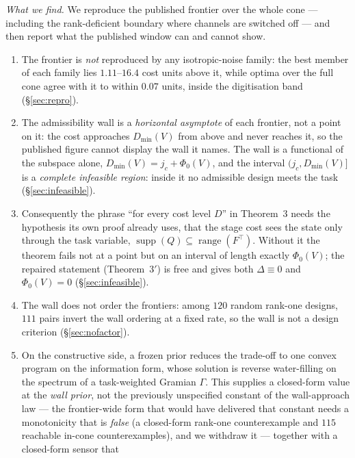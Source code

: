 \emph{What we find.} We reproduce the published frontier over the whole cone ---
including the rank-deficient boundary where channels are switched off --- and
then report what the published window can and cannot show.
\begin{enumerate}\itemsep2pt
\item The frontier is \emph{not} reproduced by any isotropic-noise family: the
      best member of each family lies $1.11$--$16.4$ cost units above it, while
      optima over the full cone agree with it to within $0.07$ units, inside the
      digitisation band (\S\ref{sec:repro}).
\item The admissibility wall is a \emph{horizontal asymptote} of each frontier,
      not a point on it: the cost approaches $D_{\min}(V)$ from above and never
      reaches it, so the published figure cannot display the wall it names. The
      wall is a functional of the subspace alone,
      $D_{\min}(V)=j_c+\Phi_0(V)$, and the interval $(j_c,D_{\min}(V)]$ is a
      \emph{complete infeasible region}: inside it no admissible design meets the
      task (\S\ref{sec:infeasible}).
\item Consequently the phrase ``for every cost level $D$'' in Theorem~3 needs the
      hypothesis its own proof already uses, that the stage cost sees the state
      only through the task variable, $\operatorname{supp}(Q)\subseteq
      \operatorname{range}(F^{\top})$. Without it the theorem fails not at a point
      but on an interval of length exactly $\Phi_0(V)$; the repaired statement
      (Theorem~3$'$) is free and gives both $\Delta\equiv0$ and $\Phi_0(V)=0$
      (\S\ref{sec:infeasible}).
\item The wall does not order the frontiers: among $120$ random rank-one designs,
      $111$ pairs invert the wall ordering at a fixed rate, so the wall is not a
      design criterion (\S\ref{sec:nofactor}).
\item On the constructive side, a frozen prior reduces the trade-off to one convex
      program on the information form, whose solution is reverse water-filling on
      the spectrum of a task-weighted Gramian $\Gamma$. This supplies a
      closed-form value at the \emph{wall prior}, not the previously
      unspecified constant of the wall-approach law --- the frontier-wide
      form that would have delivered that constant needs a monotonicity that
      is \emph{false} (a closed-form rank-one counterexample and $115$ reachable
      in-cone counterexamples), and we withdraw it --- together with a closed-form
      sensor that

\end{enumerate}
